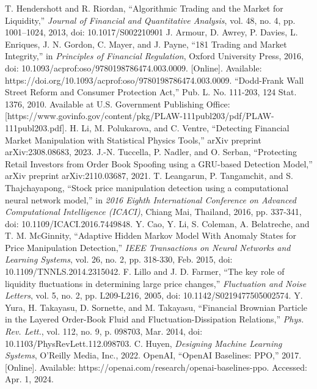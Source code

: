 \documentclass[conference]{IEEEtran}
\begin{document}
\begin{thebibliography}{00}
 T. Hendershott and R. Riordan, ``Algorithmic Trading and the Market for Liquidity,'' \textit{Journal of Financial and Quantitative Analysis}, vol. 48, no. 4, pp. 1001–1024, 2013, doi: 10.1017/S002210901
 J. Armour, D. Awrey, P. Davies, L. Enriques, J. N. Gordon, C. Mayer, and J. Payne, ``181 Trading and Market Integrity,'' in \textit{Principles of Financial Regulation}, Oxford University Press, 2016, doi: 10.1093/acprof:oso/9780198786474.003.0009. [Online]. Available: https://doi.org/10.1093/acprof:oso/9780198786474.003.0009.
 ``Dodd-Frank Wall Street Reform and Consumer Protection Act,'' Pub. L. No. 111-203, 124 Stat. 1376, 2010. Available at U.S. Government Publishing Office: [https://www.govinfo.gov/content/pkg/PLAW-111publ203/pdf/PLAW-111publ203.pdf].
 H. Li, M. Polukarova, and C. Ventre, ``Detecting Financial Market Manipulation with Statistical Physics Tools,'' arXiv preprint arXiv:2308.08683, 2023.
 J.-N. Tuccella, P. Nadler, and O. Serban, ``Protecting Retail Investors from Order Book Spoofing using a GRU-based Detection Model,'' arXiv preprint arXiv:2110.03687, 2021.
 T. Leangarun, P. Tangamchit, and S. Thajchayapong, ``Stock price manipulation detection using a computational neural network model,'' in \textit{2016 Eighth International Conference on Advanced Computational Intelligence (ICACI)}, Chiang Mai, Thailand, 2016, pp. 337-341, doi: 10.1109/ICACI.2016.7449848.
 Y. Cao, Y. Li, S. Coleman, A. Belatreche, and T. M. McGinnity, ``Adaptive Hidden Markov Model With Anomaly States for Price Manipulation Detection,'' \textit{IEEE Transactions on Neural Networks and Learning Systems}, vol. 26, no. 2, pp. 318-330, Feb. 2015, doi: 10.1109/TNNLS.2014.2315042.
 F. Lillo and J. D. Farmer, ``The key role of liquidity fluctuations in determining large price changes,'' \textit{Fluctuation and Noise Letters}, vol. 5, no. 2, pp. L209-L216, 2005, doi: 10.1142/S0219477505002574.
 Y. Yura, H. Takayasu, D. Sornette, and M. Takayasu, ``Financial Brownian Particle in the Layered Order-Book Fluid and Fluctuation-Dissipation Relations,'' \textit{Phys. Rev. Lett.}, vol. 112, no. 9, p. 098703, Mar. 2014, doi: 10.1103/PhysRevLett.112.098703.
 C. Huyen, \textit{Designing Machine Learning Systems}, O'Reilly Media, Inc., 2022.
 OpenAI, ``OpenAI Baselines: PPO,'' 2017. [Online]. Available: https://openai.com/research/openai-baselines-ppo. Accessed: Apr. 1, 2024.

\end{thebibliography}
\end{document}
